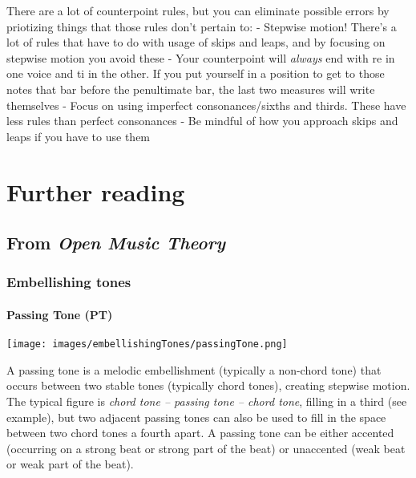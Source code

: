 \documentclass{book}
\begin{document}
There are a lot of counterpoint rules, but you can eliminate possible errors
by priotizing things that those rules don't pertain to: - Stepwise motion!
There's a lot of rules that have to do with usage of skips and leaps, and by
focusing on stepwise motion you avoid these - Your counterpoint will
\emph{always} end with re in one voice and ti in the other. If you put
yourself in a position to get to those notes that bar before the penultimate
bar, the last two measures will write themselves - Focus on using imperfect
consonances/sixths and thirds. These have less rules than perfect consonances
- Be mindful of how you approach skips and leaps if you have to use them

\hypertarget{further-reading-24}{%
\chapter{Further reading}\label{further-reading-24}}

\hypertarget{from-open-music-theory-23}{%
\section{\texorpdfstring{From \emph{Open Music
Theory}}{From Open Music Theory}}\label{from-open-music-theory-23}}

\hypertarget{embellishing-tones}{%
\subsection{Embellishing tones}\label{embellishing-tones}}

\hypertarget{passing-tone-pt-1}{%
\subsubsection{Passing Tone (PT)}\label{passing-tone-pt-1}}

\texttt{[image: images/embellishingTones/passingTone.png]}

A passing tone is a melodic embellishment (typically a non-chord tone) that
occurs between two stable tones (typically chord tones), creating stepwise
motion. The typical figure is \emph{chord tone -- passing tone -- chord tone},
filling in a third (see example), but two adjacent passing tones can also be
used to fill in the space between two chord tones a fourth apart. A passing
tone can be either accented (occurring on a strong beat or strong part of the
beat) or unaccented (weak beat or weak part of the beat).
\end{document}
